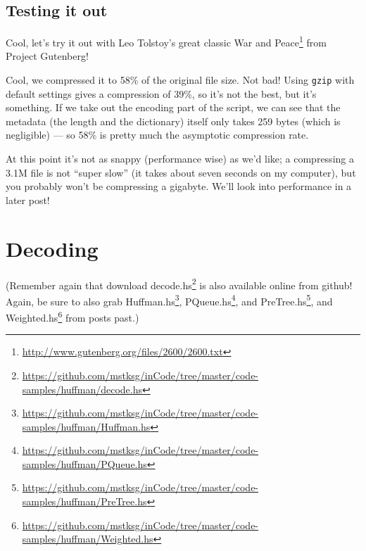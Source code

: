 \documentclass[]{article}
\newenvironment{Shaded}{}{}
\newcommand{\CommentTok}[1]{\textcolor[rgb]{0.38,0.63,0.69}{\textit{#1}}}
\newcommand{\FunctionTok}[1]{\textcolor[rgb]{0.02,0.16,0.49}{#1}}
\newcommand{\ExtensionTok}[1]{#1}
\newcommand{\NormalTok}[1]{#1}
\renewcommand{\href}[2]{#2\footnote{\url{#1}}}
\begin{document}
\subsection{Testing it out}\label{testing-it-out}

Cool, let's try it out with Leo Tolstoy's great classic
\href{http://www.gutenberg.org/files/2600/2600.txt}{War and Peace} from Project
Gutenberg!

\begin{Shaded}
\end{Shaded}

Cool, we compressed it to 58\% of the original file size. Not bad! Using
\texttt{gzip} with default settings gives a compression of 39\%, so it's not the
best, but it's something. If we take out the encoding part of the script, we can
see that the metadata (the length and the dictionary) itself only takes 259
bytes (which is negligible) --- so 58\% is pretty much the asymptotic
compression rate.

At this point it's not as snappy (performance wise) as we'd like; a compressing
a 3.1M file is not ``super slow'' (it takes about seven seconds on my computer),
but you probably won't be compressing a gigabyte. We'll look into performance in
a later post!

\section{Decoding}\label{decoding}

(Remember again that download
\href{https://github.com/mstksg/inCode/tree/master/code-samples/huffman/decode.hs}{decode.hs}
is also available online from github! Again, be sure to also grab
\href{https://github.com/mstksg/inCode/tree/master/code-samples/huffman/Huffman.hs}{Huffman.hs},
\href{https://github.com/mstksg/inCode/tree/master/code-samples/huffman/PQueue.hs}{PQueue.hs},
and
\href{https://github.com/mstksg/inCode/tree/master/code-samples/huffman/PreTree.hs}{PreTree.hs},
and
\href{https://github.com/mstksg/inCode/tree/master/code-samples/huffman/Weighted.hs}{Weighted.hs}
from posts past.)
\end{document}
